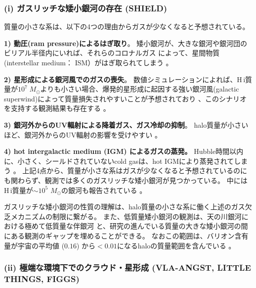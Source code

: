 \subsubsection{(i) ガスリッチな矮小銀河の存在 (SHIELD)}

質量の小さな系は、以下の4つの理由からガスが少なくなると予想されている。

\noindent
{\bf 1) 動圧(ram pressure)によるはぎ取り}。
矮小銀河が、大きな銀河や銀河団のビリアル半径内にいれば、それらのコロナルガス
によって、星間物質(interstellar medium： ISM）がはぎ取られてしまう \citep[e.g.,][]{2002MNRAS.334..673L,2003AJ....125.1926G}。

\noindent
{\bf 2) 星形成による銀河風でのガスの喪失}。
数値シミュレーションによれば、H\,{\sc i}質量が$10^7\; M_\odot$よりも小さい場合、爆発的星形成に起因する強い銀河風(galactic superwind)によって質量損失されやすいことが予想されており \citep[e.g.,][]{1999ApJ...513..142M,2000MNRAS.313..291F}、このシナリオを支持する観測結果も存在する \citep[e.g.,][]{2002ApJ...574..663M,2005MNRAS.358.1453O}。

\noindent
{\bf 3) 銀河外からのUV輻射による降着ガス、ガス冷却の抑制}。
halo質量が小さいほど、銀河外からのUV輻射の影響を受けやすい \citep{1986MNRAS.218P..25R,1992MNRAS.255..346B,2002MNRAS.333..156B,2006MNRAS.371..401H}。

\noindent
{\bf 4) hot intergalactic medium (IGM) によるガスの蒸発。}
Hubble時間以内に、小さく、シールドされていないcold gasは、hot IGMにより蒸発されてしまう \citep{2002MNRAS.333..156B}。
上記4点から、質量が小さな系はガスが少なくなると予想されているのにも関わらず、観測では多くのガスリッチな矮小銀河が見つかっている。
中にはH\,{\sc i}質量が$\sim10^5$ $M_\odot$の銀河も報告されている \citep[Leo T: ][]{2007ApJ...656L..13I}。

ガスリッチな矮小銀河の性質の理解は、halo質量の小さな系に働く上述のガス欠乏メカニズムの制限に繋がる。
また、低質量矮小銀河の観測は、天の川銀河における極めて低質量な伴銀河 \citep[e.g., Willman 1, H\,{\sc i}質量 $\sim5\times 10^5$ $M_\odot$,][]{2005ApJ...626L..85W,2007MNRAS.380..281M} と、研究の進んでいる質量の大きな矮小銀河の間にある観測のギャップを埋めることができる。
なおこの範囲は、バリオン含有量が宇宙の平均値 ($0.16$) から$<0.01$になるhaloの質量範囲を含んでいる \citep{2006MNRAS.371..401H,2010ApJ...708L..14M}。


\subsubsection{(ii) 極端な環境下でのクラウド・星形成 (VLA-ANGST, LITTLE THINGS, FIGGS)}


